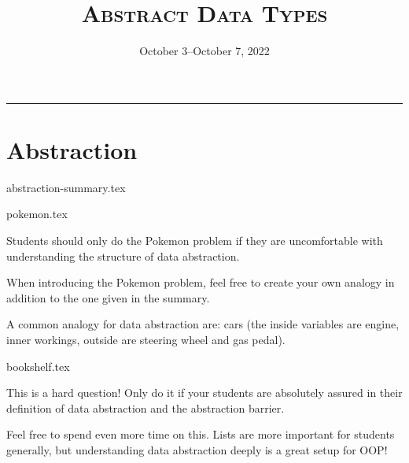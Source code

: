 \documentclass{exam}
\title{\textsc{Abstract Data Types}}
\date{October 3--October 7, 2022}
\begin{document}
\maketitle
\rule{\textwidth}{0.15em}
\fontsize{12}{15}\selectfont



\section{Abstraction}
{abstraction-summary.tex}
\begin{questions}
    {pokemon.tex}
    \begin{questionmeta}
        Students should only do the Pokemon problem if they are uncomfortable with understanding the structure of data abstraction.
    \end{questionmeta}
    \begin{questionmeta}
        When introducing the Pokemon problem, feel free to create your own analogy in addition to the one given in the summary.
    \end{questionmeta}
    \begin{questionmeta}
        A common analogy for data abstraction are: cars (the inside variables are engine, inner workings, outside are steering wheel and gas pedal).
    \end{questionmeta}
    {bookshelf.tex}
    \begin{questionmeta}
        This is a hard question! Only do it if your students are absolutely assured in their definition of data abstraction and the abstraction barrier.
    \end{questionmeta}
    \begin{questionmeta}
        Feel free to spend even more time on this. Lists are more important for students generally, but understanding data abstraction deeply is a great setup for OOP!
    \end{questionmeta}
\end{questions}
\end{document}
